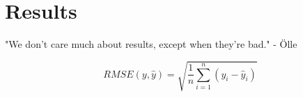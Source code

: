 \section{Results}

"We don't care much about results, except when they're bad." - Ölle


\begin{equation}\label{rmse}
RMSE(y,\hat{y}) = \sqrt{\frac{1}{n}  \sum_{i=1}^{n} (y_i - \hat{y}_i)}
\end{equation}